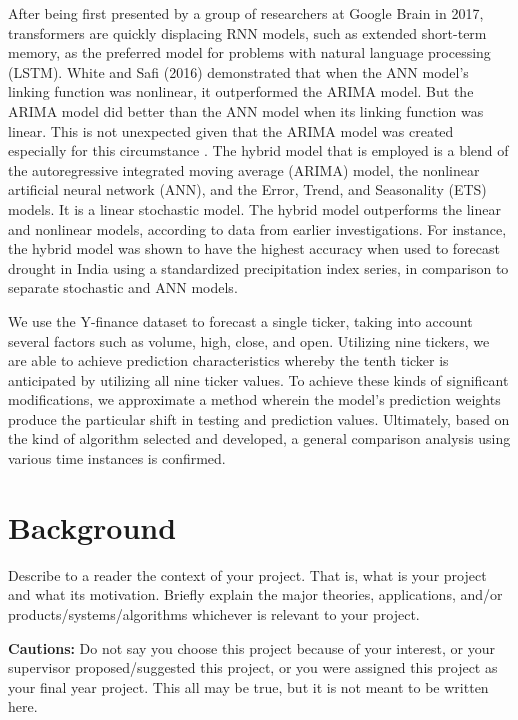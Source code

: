 After being first presented by a group of researchers at Google Brain in 2017, transformers are quickly displacing RNN models, such as extended short-term memory, as the preferred model for problems with natural language processing (LSTM). White and Safi (2016) demonstrated that when the ANN model's linking function was nonlinear, it outperformed the ARIMA model. But the ARIMA model did better than the ANN model when its linking function was linear. This is not unexpected given that the ARIMA model was created especially for this circumstance \cite{safi2021hybrid}. The hybrid model that is employed is a blend of the autoregressive integrated moving average (ARIMA) model, the nonlinear artificial neural network (ANN), and the Error, Trend, and Seasonality (ETS) models. It is a linear stochastic model. The hybrid model outperforms the linear and nonlinear models, according to data from earlier investigations. For instance, the hybrid model was shown to have the highest accuracy when used to forecast drought in India using a standardized precipitation index series, in comparison to separate stochastic and ANN models.

We use the Y-finance dataset to forecast a single ticker, taking into account several factors such as volume, high, close, and open. Utilizing nine tickers, we are able to achieve prediction characteristics whereby the tenth ticker is anticipated by utilizing all nine ticker values. To achieve these kinds of significant modifications, we approximate a method wherein the model's prediction weights produce the particular shift in testing and prediction values. Ultimately, based on the kind of algorithm selected and developed, a general comparison analysis using various time instances is confirmed. 

\section{Background}
\label{sec:into_back}
Describe to a reader the context of your project. That is, what is your project and what its motivation. Briefly explain the major theories, applications, and/or products/systems/algorithms whichever is relevant to your project.

\textbf{Cautions:} Do not say you choose this project because of your interest, or your supervisor proposed/suggested this project, or you were assigned this project as your final year project. This all may be true, but it is not meant to be written here.

